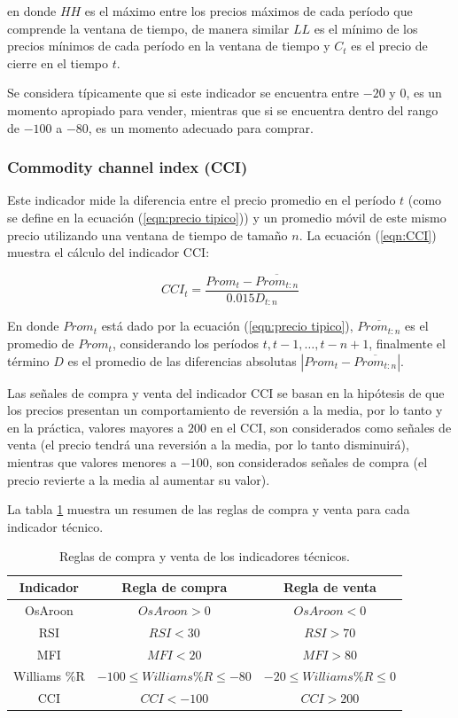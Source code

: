 \documentclass[12pt]{report}
\theoremstyle{break}
\theoremstyle{break}
\begin{document}
en donde $HH$ es el máximo entre los precios máximos de cada período que comprende la ventana de tiempo, de manera similar $LL$ es el mínimo de los precios mínimos de cada período en la ventana de tiempo y $C_t$ es el precio de cierre en el tiempo $t$.

Se considera típicamente que si este indicador se encuentra entre $-20$ y $0$, es un momento apropiado para vender, mientras que si se encuentra dentro del rango de $-100$ a $-80$, es un momento adecuado para comprar.

\subsubsection{Commodity channel index (CCI)}
\label{subsubseccion:cci}
Este indicador mide la diferencia entre el precio promedio en el período $t$ (como se define en la ecuación (\ref{eqn:precio tipico})) y un promedio móvil de este mismo precio utilizando una ventana de tiempo de tamaño $n$. La ecuación (\ref{eqn:CCI}) muestra el cálculo del indicador CCI:

\begin{equation} \label{eqn:CCI}
CCI_t = \dfrac{ Prom_t - \overline{Prom_{t:n}} }{ 0.015 D_{t:n}}
\end{equation}

En donde $Prom_t$ está dado por la ecuación (\ref{eqn:precio tipico}), $\overline{Prom_{t:n}}$ es el promedio de $Prom_t$, considerando los períodos $t, t-1, \ldots, t-n +1$, finalmente el término $D$ es el promedio de las diferencias absolutas $\left|Prom_t - \overline{Prom_{t:n}}  \right|$.

Las señales de compra y venta del indicador CCI se basan en la hipótesis de que los precios presentan un comportamiento de reversión a la media, por lo tanto y en la práctica, valores mayores a $200$ en el CCI, son considerados como señales de venta (el precio tendrá una reversión a la media, por lo tanto disminuirá), mientras que valores menores a $-100$, son considerados señales de compra (el precio revierte a la media al aumentar su valor).

La tabla \ref{tabla:resumen reglas indicadores} muestra un resumen de las reglas de compra y venta para cada indicador técnico.

\begin{table}[h]
\centering
\begin{tabular}{ccc}
\hline
\textbf{Indicador} & \textbf{Regla de compra} & \textbf{Regla de  venta} \\
\hline
OsAroon & $OsAroon>0$ & $OsAroon<0$ \\
RSI & $RSI < 30$ & $RSI > 70$ \\
MFI & $MFI < 20$ & $MFI > 80$ \\
Williams \%R & $-100 \leq Williams \%R \leq -80 $ & $-20 \leq Williams \%R \leq 0$ \\
CCI & $CCI < -100$ & $CCI > 200$ \\

\hline
\end{tabular}
\caption{\label{tabla:resumen reglas indicadores} Reglas de compra y venta de los indicadores técnicos.}
\end{table}
\end{document}
